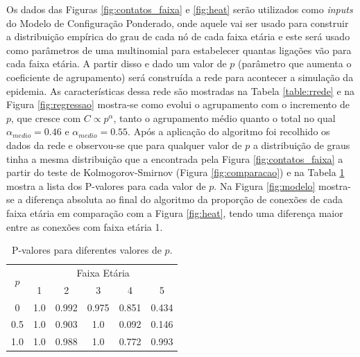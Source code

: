 Os dados das Figuras 
\ref{fig:contatos_faixa} e \ref{fig:heat} serão utilizados como \textit{inputs} do Modelo de Configuração Ponderado, onde aquele vai ser usado para construir a distribuição empírica do grau de cada nó de cada faixa etária e este será usado como parâmetros de uma multinomial para estabelecer quantas ligações vão para cada faixa etária. A partir disso e dado um valor de $p$ 
(parâmetro que aumenta o coeficiente de agrupamento)
será construída a rede para acontecer a simulação da epidemia. As características dessa rede são mostradas na Tabela \ref{table:rrede} e na Figura \ref{fig:regressao}
mostra-se como evolui o agrupamento com o incremento de $p$, que cresce com $C \propto p^{\alpha}$, tanto o agrupamento médio quanto o total no qual $\alpha_{medio } = 0.46$ e $\alpha_{medio } = 0.55$. Após a aplicação do algoritmo foi recolhido os dados da rede e observou-se que para qualquer valor de $p$ a distribuição de graus tinha a mesma distribuição que a encontrada pela Figura \ref{fig:contatos_faixa} a partir do teste de Kolmogorov-Smirnov (Figura \ref{fig:comparacao}) \cite{manual} e na Tabela \ref{tab:pvalor} mostra a lista dos P-valores para cada valor de $p$. Na Figura \ref{fig:modelo}
mostra-se a diferença absoluta ao final do algoritmo da proporção de conexões de cada faixa etária em comparação com a Figura \ref{fig:heat}, tendo uma diferença maior entre as conexões com faixa etária 1.


\begin{table}[H]
    \centering
    \captionsetup{font=normalsize,skip=0.8pt,singlelinecheck=on,labelsep=endash}
    \caption{P-valores para diferentes valores de $p$.}
    \begin{tabular}{|c|c|c|c|c|c|}
    
    \hline
    \multirow{2}{*}{$p$} & \multicolumn{5}{c|}{Faixa Etária} \\ \cline{2-6} 
     & 1 & 2 & 3 & 4 & 5 \\ \hline
    0 & 1.0 & 0.992 & 0.975 & 0.851 & 0.434 \\ \hline
    \rowcolor{Gray}
    0.5 & 1.0 & 0.903 & 1.0 & 0.092 & 0.146 \\ \hline
    1.0 & 1.0 & 0.988 & 1.0 & 0.772 & 0.993 \\ \hline
    \end{tabular}
    \label{tab:pvalor}
\end{table}

